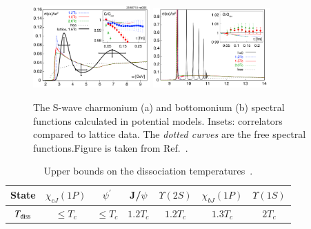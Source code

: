 \begin{figure}[]
   \begin{center}
      {\includegraphics[width=0.4\textwidth]{Figures/JPsi_SpecFuncLattQCD.png}}
      {\includegraphics[width=0.4\textwidth]{Figures/Y1S_SpecFuncLattQCD.png}}
      \caption{The S-wave charmonium (a) and 
        bottomonium (b) spectral 
        functions calculated in potential 
        models. 
        Insets: correlators compared to lattice data.  
        The {\it dotted curves} are the
        free spectral functions.Figure is taken from Ref.~\cite{Mocsy:2007yj}.
      }
      \label{Fig:QuarkoniaSpecFuncLattice} 
   \end{center}
\end{figure}





\begin{table}[tb]
   \caption{Upper bounds on the dissociation 
             temperatures~\cite{Mocsy:2007jz}.
             }
   \label{tab:LatticeDissTemp}
   \setlength{\tabcolsep}{0.41pc}
   \begin{center}
      \begin{tabular}{ccccccc}
      \hline\hline
      State & $\chi_{cJ}(1P)$ & $\psi^{'}$ &J/$\psi$  &$\Upsilon(2S)$ & $\chi_{bJ}(1P)$ &$\Upsilon(1S)$ \\%
      \hline 
      $T_{\rm diss}$ & $\le T_c$ & $\le T_c$ & $1.2T_c$ & $1.2T_c$ & $1.3T_c$ & $2T_c$\\ 
\hline\hline
\end{tabular}
\end{center}
\end{table}



